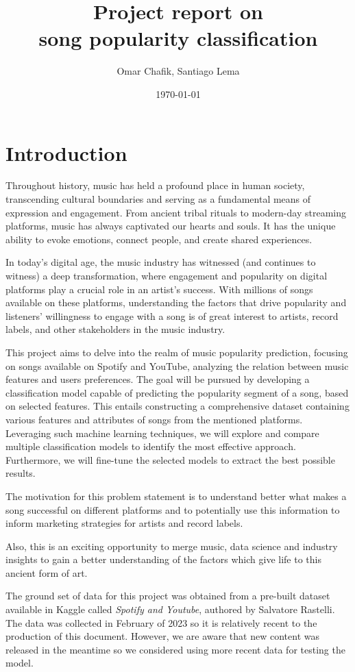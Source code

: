 \documentclass[11pt]{article} %
\title{Project report on\\
song popularity classification \\
}
\author{Omar Chafik, Santiago Lema}
\date{\today}
\begin{document}
\maketitle

\section{Introduction}

Throughout history, music has held a profound place in human society, transcending cultural boundaries and serving as a fundamental means of expression and engagement. From ancient tribal rituals to modern-day streaming platforms, music has always captivated our hearts and souls. It has the unique ability to evoke emotions, connect people, and create shared experiences.

In today's digital age, the music industry has witnessed (and continues to witness) a deep transformation, where engagement and popularity on digital platforms play a crucial role in an artist's success. With millions of songs available on these platforms, understanding the factors that drive popularity and listeners' willingness to engage with a song is of great interest to artists, record labels, and other stakeholders in the music industry.

This project aims to delve into the realm of music popularity prediction, focusing on songs available on Spotify and YouTube, analyzing the relation between music features and users preferences. The goal will be pursued by developing  a classification model capable of predicting the popularity segment of a song, based on selected features. This entails constructing a comprehensive dataset containing various features and attributes of songs from the mentioned platforms. Leveraging such machine learning techniques, we will explore and compare multiple classification models to identify the most effective approach. Furthermore, we will fine-tune the selected models to extract the best possible results.

The motivation for this problem statement is to understand better  what makes a song successful on different platforms and to potentially use this information to inform marketing strategies for artists and record labels.

Also, this is an exciting opportunity to merge music, data science and industry insights to gain a better understanding of the factors which give life to this ancient form of art.

The ground set of data for this project was obtained from a pre-built dataset available in Kaggle called \textit{Spotify and Youtube}, authored by Salvatore Rastelli\cite{Rasetri}. The data was collected in February of 2023 so it is relatively recent to the production of this document. However, we are aware that new content was released in the meantime so we considered using more recent data for testing the model.
\end{document}

